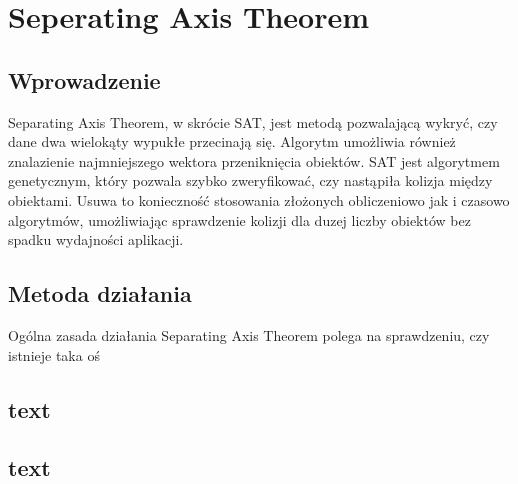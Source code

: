 \chapter{Seperating Axis Theorem}
\label{t:int}

\section{Wprowadzenie}
Separating Axis Theorem, w skrócie SAT, jest metodą pozwalającą wykryć, czy dane dwa wielokąty wypukłe przecinają się. Algorytm umożliwia również znalazienie najmniejszego wektora przeniknięcia obiektów.  SAT jest algorytmem genetycznym, który pozwala szybko zweryfikować, czy nastąpiła kolizja między obiektami. Usuwa to konieczność stosowania złożonych obliczeniowo jak i czasowo algorytmów, umożliwiając sprawdzenie kolizji dla duzej liczby obiektów bez spadku wydajności aplikacji.

\section{Metoda działania}
Ogólna zasada działania Separating Axis Theorem polega na sprawdzeniu, czy istnieje taka oś

\section{text}

\section{text}
